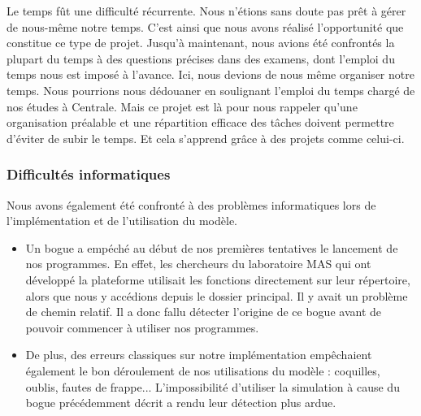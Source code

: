 Le temps fût une difficulté récurrente. Nous n'étions sans doute pas prêt à gérer de nous-même notre temps. C'est ainsi que nous avons réalisé l'opportunité que constitue ce type de projet. 
Jusqu'à maintenant, nous avions été confrontés la plupart du temps à des questions précises dans des examens, dont l'emploi du temps nous est imposé à l'avance. 
Ici, nous devions de nous même organiser notre temps. 
Nous pourrions nous dédouaner en soulignant l'emploi du temps chargé de nos études à Centrale. 
Mais ce projet est là pour nous rappeler qu'une organisation préalable et une répartition efficace des tâches doivent permettre d'éviter de subir le temps. Et cela s'apprend grâce à des projets comme celui-ci.

\subsubsection{Difficultés informatiques}

Nous avons également été confronté à des problèmes informatiques lors de l'implémentation et de l'utilisation du modèle.
\begin{itemize}
	\item Un bogue a empéché au début de nos premières tentatives le lancement de nos programmes. En effet, les chercheurs
du laboratoire MAS qui ont développé la plateforme utilisait les fonctions directement sur leur répertoire, alors que nous y accédions depuis le dossier principal. Il y avait un problème de chemin relatif. Il a donc fallu détecter l'origine de ce bogue avant de pouvoir commencer à utiliser nos programmes. 
	
	\item De plus, des erreurs classiques sur notre implémentation empêchaient également le bon déroulement de nos utilisations du modèle : coquilles, oublis, fautes de frappe... L'impossibilité d'utiliser la simulation à cause du bogue précédemment décrit a rendu leur détection plus ardue.

\end{itemize}
